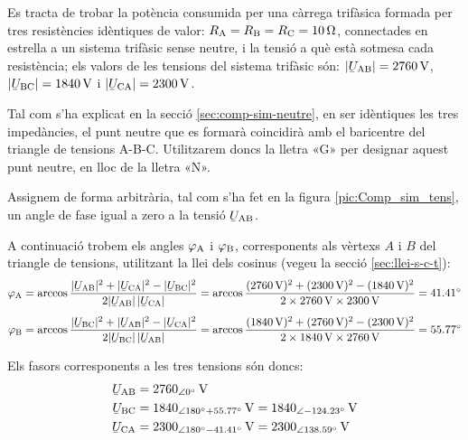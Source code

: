 \begin{exemple}\label{ex:comp-sim}
    Es tracta de trobar la potència consumida per una càrrega trifàsica
    formada per tres resistències idèntiques de valor: $R_\mathrm{A}=R_\mathrm{B}=R_\mathrm{C}=\qty{10}{\ohm}$,
    connectades en estrella a un sistema trifàsic sense neutre, i la
    tensió a què està sotmesa cada resistència; els valors de les
    tensions del sistema trifàsic són: $|\cmplx{U}\ped{AB}| =
    \qty{2760}{V}$, $|\cmplx{U}\ped{BC}| = \qty{1840}{V}$ i
    $|\cmplx{U}\ped{CA}| = \qty{2300}{V}$.

    Tal com s'ha explicat en la secció \vref{sec:comp-sim-neutre}, en ser idèntiques les tres impedàncies, el punt neutre que es formarà coincidirà amb el baricentre del triangle de tensions A-B-C. Utilitzarem doncs la lletra «G» per designar aquest punt neutre, en lloc de la lletra «N».

    Assignem de forma arbitrària, tal com s'ha fet en la figura
    \vref{pic:Comp_sim_tens}, un angle de fase igual a zero a la tensió
    $\cmplx{U}\ped{AB}$.

    \begin{center}
        
    \end{center}

    A continuació trobem els angles $\varphi_\mathrm{A}$ i $\varphi_\mathrm{B}$,
    corresponents als vèrtexs  $A$ i $B$ del triangle de
    tensions, utilitzant la llei dels cosinus (vegeu la secció
    \vref{sec:llei-s-c-t}): 
    \begin{align*}
        \varphi\ped{A} &= \arccos \frac{|\cmplx{U}\ped{AB}|^2 + |\cmplx{U}\ped{CA}|^2 -
        |\cmplx{U}\ped{BC}|^2}{2 |\cmplx{U}\ped{AB}| \,|\cmplx{U}\ped{CA}|} =
        \arccos \frac{(\qty{2760}{V})^2 + (\qty{2300}{V})^2 - (\qty{1840}{V})^2}{2 \times \qty{2760}{V}
        \times \qty{2300}{V}} = \ang{41,41} \\[1ex]
        \varphi\ped{B} &= \arccos \frac{|\cmplx{U}\ped{BC}|^2 + |\cmplx{U}\ped{AB}|^2 -
        |\cmplx{U}\ped{CA}|^2}{2 |\cmplx{U}\ped{BC}| \,|\cmplx{U}\ped{AB}|} =
        \arccos \frac{(\qty{1840}{V})^2 + (\qty{2760}{V})^2 - (\qty{2300}{V})^2}{2 \times \qty{1840}{V}
        \times \qty{2760}{V}} = \ang{55,77}
    \end{align*}

    Els fasors corresponents a les tres tensions són doncs:
    \begin{align*}
    \cmplx{U}\ped{AB} &= \qtypd{2760}{0}{V} \\
    \cmplx{U}\ped{BC} &= \num{1840}_{\angle\ang{180} + \ang{55,77}}\unit{\,V} =
    \qtypd{1840}{-124,23}{V} \\
    \cmplx{U}\ped{CA} &= \num{2300}_{\angle\ang{180} - \ang{41,41}}\unit{\,V} = \qtypd{2300}{138,59}{V}
    \end{align*}


\end{exemple}
